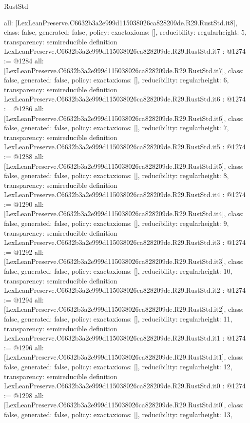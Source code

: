 \begin{lexlean}{RustStd}
\begin{coremodule}
{  all: [LexLeanPreserve.C6632b3a2e999d115038026ca828209de.R29.RustStd.it8],
  class: false,
  generated: false,
  policy: exact{axioms: []},
  reducibility: regular{height: 5},
  transparency: semireducible
}
definition LexLeanPreserve.C6632b3a2e999d115038026ca828209de.R29.RustStd.it7 : @1274 := @1284 {
  all: [LexLeanPreserve.C6632b3a2e999d115038026ca828209de.R29.RustStd.it7],
  class: false,
  generated: false,
  policy: exact{axioms: []},
  reducibility: regular{height: 6},
  transparency: semireducible
}
definition LexLeanPreserve.C6632b3a2e999d115038026ca828209de.R29.RustStd.it6 : @1274 := @1286 {
  all: [LexLeanPreserve.C6632b3a2e999d115038026ca828209de.R29.RustStd.it6],
  class: false,
  generated: false,
  policy: exact{axioms: []},
  reducibility: regular{height: 7},
  transparency: semireducible
}
definition LexLeanPreserve.C6632b3a2e999d115038026ca828209de.R29.RustStd.it5 : @1274 := @1288 {
  all: [LexLeanPreserve.C6632b3a2e999d115038026ca828209de.R29.RustStd.it5],
  class: false,
  generated: false,
  policy: exact{axioms: []},
  reducibility: regular{height: 8},
  transparency: semireducible
}
definition LexLeanPreserve.C6632b3a2e999d115038026ca828209de.R29.RustStd.it4 : @1274 := @1290 {
  all: [LexLeanPreserve.C6632b3a2e999d115038026ca828209de.R29.RustStd.it4],
  class: false,
  generated: false,
  policy: exact{axioms: []},
  reducibility: regular{height: 9},
  transparency: semireducible
}
definition LexLeanPreserve.C6632b3a2e999d115038026ca828209de.R29.RustStd.it3 : @1274 := @1292 {
  all: [LexLeanPreserve.C6632b3a2e999d115038026ca828209de.R29.RustStd.it3],
  class: false,
  generated: false,
  policy: exact{axioms: []},
  reducibility: regular{height: 10},
  transparency: semireducible
}
definition LexLeanPreserve.C6632b3a2e999d115038026ca828209de.R29.RustStd.it2 : @1274 := @1294 {
  all: [LexLeanPreserve.C6632b3a2e999d115038026ca828209de.R29.RustStd.it2],
  class: false,
  generated: false,
  policy: exact{axioms: []},
  reducibility: regular{height: 11},
  transparency: semireducible
}
definition LexLeanPreserve.C6632b3a2e999d115038026ca828209de.R29.RustStd.it1 : @1274 := @1296 {
  all: [LexLeanPreserve.C6632b3a2e999d115038026ca828209de.R29.RustStd.it1],
  class: false,
  generated: false,
  policy: exact{axioms: []},
  reducibility: regular{height: 12},
  transparency: semireducible
}
definition LexLeanPreserve.C6632b3a2e999d115038026ca828209de.R29.RustStd.it0 : @1274 := @1298 {
  all: [LexLeanPreserve.C6632b3a2e999d115038026ca828209de.R29.RustStd.it0],
  class: false,
  generated: false,
  policy: exact{axioms: []},
  reducibility: regular{height: 13},
}
\end{coremodule}
\end{lexlean}
